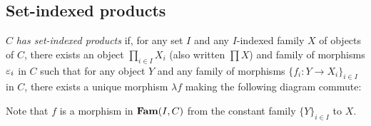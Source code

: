 \subsection{Set-indexed products}

$C$ \emph{has set-indexed products} if, for any set $I$ and any $I$-indexed family $X$ of objects of $C$,
there exists an object $\prod_{i \in I}X_i$ (also written $\prod X$) and family of morphisms $\varepsilon_i$ in $C$
such that for any object $Y$ and any family of morphisms $\{f_i: Y \to X_i\}_{i \in I}$ in $C$, there exists a
unique morphism $\lambda f$ making the following diagram commute:

\begin{center}
\end{center}

Note that $f$ is a morphism in $\mathbf{Fam}(I,C)$ from the constant family $\{Y\}_{i \in I}$ to $X$.
